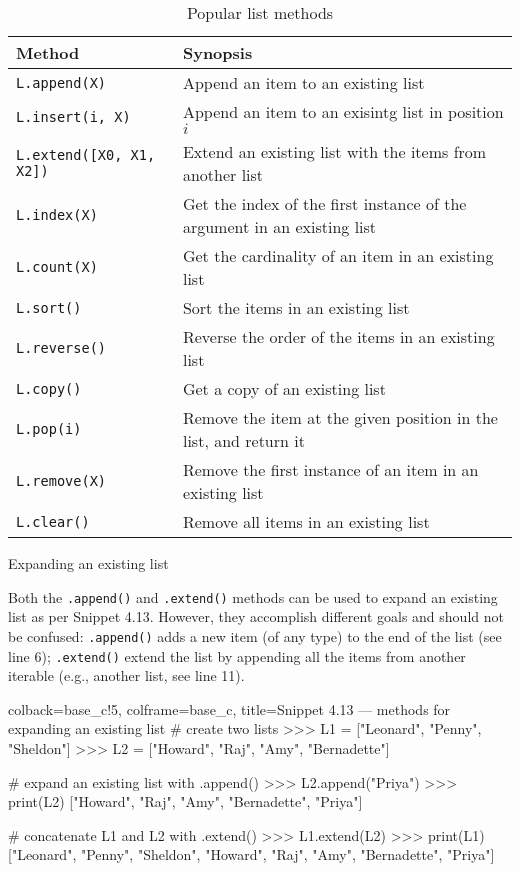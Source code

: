 \documentclass[a4paper,11pt]{book}
\numberwithin{figure}{chapter}
\numberwithin{table}{chapter}
\newcommand{\question}[1]{%
    \begin{tcolorbox}[colback=comp_c!10,colframe=comp_c,sidebyside align=top,width=\linewidth,before skip=1ex]
        #1
    \end{tcolorbox}%
    \switchcolumn%
}
\newcommand{\note}[1]{%
    \begin{tcolorbox}[colback=white!0,colframe=white!10,width=\linewidth,before skip=1ex]
        #1
    \end{tcolorbox}         
}
\begin{document}
\begin{table}[!htbp]
	\caption{Popular list methods}
	\label{tab:list_methods}
	\centering
	\begin{tabular}{ll}
		\toprule \toprule
		Method & Synopsis \\
		\midrule 
		\texttt{L.append(X)} & Append an item to an existing list\\
		\texttt{L.insert(i, X)} & Append an item to an exisintg list in position $i$ \\
		\texttt{L.extend([X0, X1, X2])} & Extend an existing list with the items from another list\\
		\texttt{L.index(X)} & Get the index of the first instance of the argument in an existing list\\
		\texttt{L.count(X)} & Get the cardinality of an item in an existing list\\
		\texttt{L.sort()} & Sort the items in an existing list\\
		\texttt{L.reverse()} & Reverse the order of the items in an existing list\\
		\texttt{L.copy()} & Get a copy of an existing list\\
		\texttt{L.pop(i)} & Remove the item at the given position in the list, and return it\\
		\texttt{L.remove(X)} & Remove the first instance of an item in an existing list\\
		\texttt{L.clear()} & Remove all items in an existing list\\
		\bottomrule 
	\end{tabular}
\end{table}

\begin{paracol}{2}
	\question{\raggedright Expanding an existing list}
	\note{Both the \texttt{.append()} and \texttt{.extend()} methods can be used to expand an existing list as per Snippet 4.13. However, they accomplish different goals and should not be confused: \texttt{.append()} adds a new item (of any type) to the end of the list (see line 6); \texttt{.extend()} extend the list by appending all the items from another iterable (e.g., another list, see line 11).}
\end{paracol}

\begin{pythoncode}[linenos=true,]{colback=base_c!5, colframe=base_c, title=\sffamily Snippet 4.13 --- methods for expanding an existing list}
# create two lists 
>>> L1 = ["Leonard", "Penny", "Sheldon"]
>>> L2 = ["Howard", "Raj", "Amy", "Bernadette"]

# expand an existing list with .append()
>>> L2.append("Priya") 
>>> print(L2)
["Howard", "Raj", "Amy", "Bernadette", "Priya"]

# concatenate L1 and L2 with .extend()
>>> L1.extend(L2)
>>> print(L1)
["Leonard", "Penny", "Sheldon", "Howard", "Raj", "Amy", "Bernadette", "Priya"]

\end{pythoncode}
\end{document}
